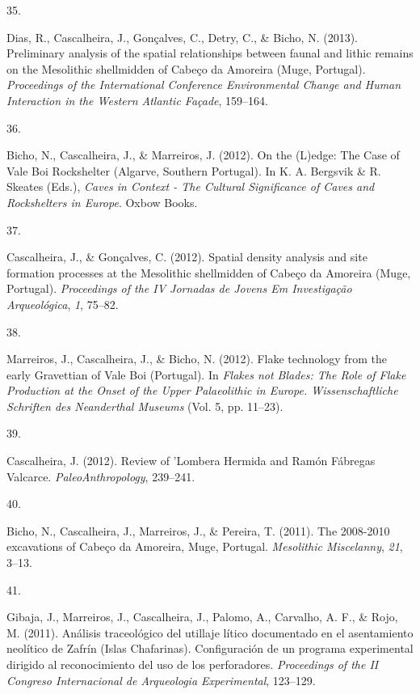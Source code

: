 \documentclass[11pt,a4paper,]{awesome-cv}
\newlength{\cslhangindent}
\newlength{\csllabelwidth}
\newenvironment{CSLReferences}[2] %
 {\begin{list}{}{%
  \setlength{\itemindent}{0pt}
  \setlength{\leftmargin}{0pt}
  \setlength{\parsep}{0pt}
  \ifodd #1
   \setlength{\leftmargin}{\cslhangindent}
   \setlength{\itemindent}{-1\cslhangindent}
  \fi
  \setlength{\itemsep}{#2\baselineskip}}}
 {\end{list}}
\newcommand{\CSLLeftMargin}[1]{\parbox[t]{\csllabelwidth}{\strut#1\strut}}
\newcommand{\CSLRightInline}[1]{\parbox[t]{\linewidth - \csllabelwidth}{\strut#1\strut}}
\begin{document}
\begin{CSLReferences}{0}{0}
\CSLLeftMargin{35. }%
\CSLRightInline{Dias, R., Cascalheira, J., Gonçalves, C., Detry, C., \&
Bicho, N. (2013). Preliminary analysis of the spatial relationships
between faunal and lithic remains on the Mesolithic shellmidden of
Cabeço da Amoreira (Muge, Portugal). \emph{Proceedings of the
International Conference Environmental Change and Human Interaction in
the Western Atlantic Façade}, 159--164.}

\CSLLeftMargin{36. }%
\CSLRightInline{Bicho, N., Cascalheira, J., \& Marreiros, J. (2012). On
the (L)edge: The Case of Vale Boi Rockshelter (Algarve, Southern
Portugal). In K. A. Bergsvik \& R. Skeates (Eds.), \emph{Caves in
Context - The Cultural Significance of Caves and Rockshelters in
Europe}. Oxbow Books.}

\CSLLeftMargin{37. }%
\CSLRightInline{Cascalheira, J., \& Gonçalves, C. (2012). Spatial
density analysis and site formation processes at the Mesolithic
shellmidden of Cabeço da Amoreira (Muge, Portugal). \emph{Proceedings of
the IV Jornadas de Jovens Em Investigação Arqueológica}, \emph{1},
75--82.}

\CSLLeftMargin{38. }%
\CSLRightInline{Marreiros, J., Cascalheira, J., \& Bicho, N. (2012).
Flake technology from the early Gravettian of Vale Boi (Portugal). In
\emph{Flakes not Blades: The Role of Flake Production at the Onset of
the Upper Palaeolithic in Europe. Wissenschaftliche Schriften des
Neanderthal Museums} (Vol. 5, pp. 11--23).}

\CSLLeftMargin{39. }%
\CSLRightInline{Cascalheira, J. (2012). Review of 'Lombera Hermida and
Ramón Fábregas Valcarce. \emph{PaleoAnthropology}, 239--241.}

\CSLLeftMargin{40. }%
\CSLRightInline{Bicho, N., Cascalheira, J., Marreiros, J., \& Pereira,
T. (2011). The 2008-2010 excavations of Cabeço da Amoreira, Muge,
Portugal. \emph{Mesolithic Miscelanny}, \emph{21}, 3--13.}

\CSLLeftMargin{41. }%
\CSLRightInline{Gibaja, J., Marreiros, J., Cascalheira, J., Palomo, A.,
Carvalho, A. F., \& Rojo, M. (2011). Análisis traceológico del utillaje
lítico documentado en el asentamiento neolítico de Zafrín (Islas
Chafarinas). Configuración de un programa experimental dirigido al
reconocimiento del uso de los perforadores. \emph{Proceedings of the II
Congreso Internacional de Arqueologia Experimental}, 123--129.}


\end{CSLReferences}
\end{document}
